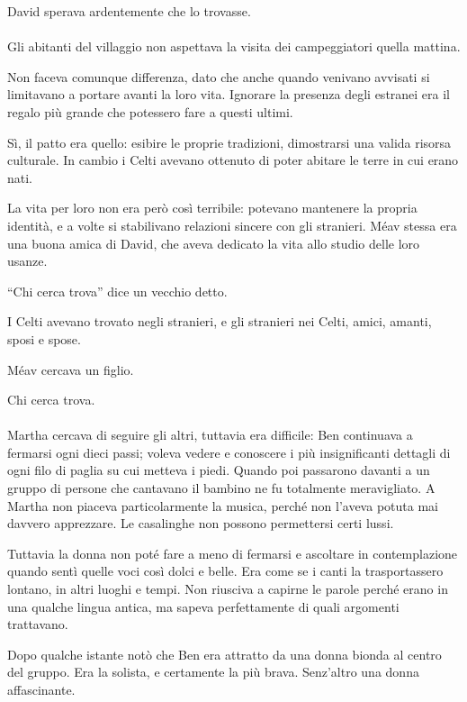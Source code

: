 \documentclass[a4paper,12pt]{book}
\begin{document}
David sperava ardentemente che lo trovasse.

\paragraph{}
Gli abitanti del villaggio non aspettava la visita dei campeggiatori quella
mattina.

Non faceva comunque differenza, dato che anche quando venivano avvisati si
limitavano a portare avanti la loro vita. Ignorare la presenza degli estranei
era il regalo più grande che potessero fare a questi ultimi.

Sì, il patto era quello: esibire le proprie tradizioni, dimostrarsi una valida
risorsa culturale. In cambio i Celti avevano ottenuto di poter abitare le terre
in cui erano nati.

La vita per loro non era però così terribile: potevano mantenere la propria
identità, e a volte si stabilivano relazioni sincere con gli stranieri. Méav
stessa era una buona amica di David, che aveva dedicato la vita allo studio
delle loro usanze.

``Chi cerca trova'' dice un vecchio detto.

I Celti avevano trovato negli stranieri, e gli stranieri nei Celti, amici,
amanti, sposi e spose.

Méav cercava un figlio.

Chi cerca trova.

\paragraph{}
Martha cercava di seguire gli altri, tuttavia era difficile: Ben continuava a
fermarsi ogni dieci passi; voleva vedere e conoscere i più insignificanti
dettagli di ogni filo di paglia su cui metteva i piedi. Quando poi passarono
davanti a un gruppo di persone che cantavano il bambino ne fu totalmente
meravigliato. A Martha non piaceva particolarmente la musica, perché non
l'aveva potuta mai davvero apprezzare. Le casalinghe non possono permettersi
certi lussi.

Tuttavia la donna non poté fare a meno di fermarsi e ascoltare in
contemplazione quando sentì quelle voci così dolci e belle. Era come se i
canti la trasportassero lontano, in altri luoghi e tempi. Non riusciva a capirne
le parole perché erano in una qualche lingua antica, ma sapeva perfettamente di
quali argomenti trattavano.

Dopo qualche istante notò che Ben era attratto da una donna bionda al centro
del gruppo. Era la solista, e certamente la più brava. Senz'altro una donna
affascinante.
\end{document}

